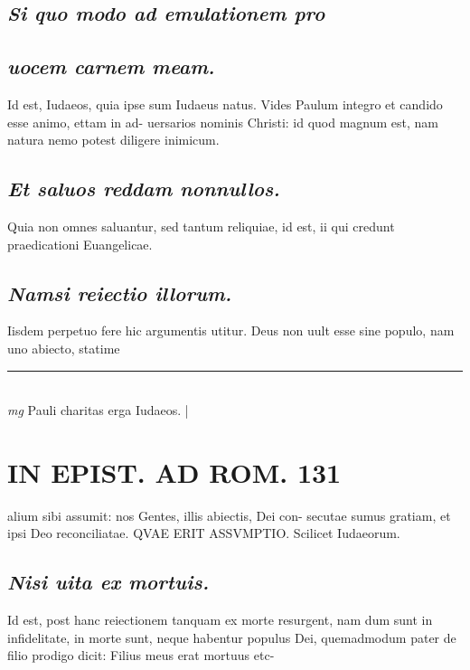 \documentclass{article}
\begin{document}
\begin{pages}
\subsection*{\textit{Si quo modo ad emulationem pro }}
{}
\subsection*{\textit{uocem carnem meam. }}\pstart Id est, Iudaeos, quia ipse sum Iudaeus natus. Vides Paulum integro et candido esse animo, ettam in ad- uersarios nominis Christi: id quod magnum est, nam natura nemo potest diligere inimicum.   \pend
{}
{}
\subsection*{\textit{Et saluos reddam nonnullos. }}\pstart Quia non omnes saluantur, sed tantum reliquiae, id est, ii qui credunt praedicationi Euangelicae.  \pend
{}
{}
\subsection*{\textit{Namsi reiectio illorum. }}\pstart Iisdem perpetuo fere hic argumentis utitur. Deus non uult esse sine populo, nam uno abiecto, statime  \pend
\vspace{0.5cm}\noindent
\vspace{0.2cm}\rule{1cm}{0.2pt}\\ 
\hspace{0.2cm}\textit{mg}
\footnotesize Pauli charitas erga Iudaeos.  
\normalsize| 
\section*{IN EPIST. AD ROM.  131 }
\marginpar{[ p.]}\pstart alium sibi assumit: nos Gentes, illis abiectis, Dei con- secutae sumus gratiam, et ipsi Deo reconciliatae. QVAE ERIT ASSVMPTIO. Scilicet Iudaeorum.   \pend
{}
{}
\subsection*{\textit{Nisi uita ex mortuis. }}\pstart Id est, post hanc reiectionem tanquam ex morte resurgent, nam dum sunt in infidelitate, in morte sunt, neque habentur populus Dei, quemadmodum pater de filio prodigo dicit: Filius meus erat mortuus etc-  \pend
{}
{}

\end{pages}
\end{document}

